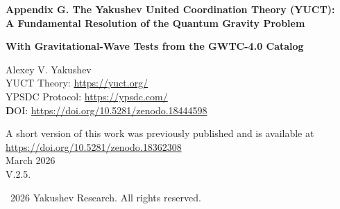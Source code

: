 \documentclass[12pt,a4paper]{article}
\theoremstyle{remark}
\newcommand{\Keff}{K_{\mathrm{eff}}}
\begin{document}
	
	\begin{titlepage}
		\begin{center}
			\vspace*{0cm}
			
			\Huge\textbf{Appendix G. The Yakushev United Coordination Theory (YUCT): \\ A Fundamental Resolution of the Quantum Gravity Problem}
			
			\vspace{0.5cm}
			\Large\textbf{With Gravitational-Wave Tests from the GWTC-4.0 Catalog}
			
			\vspace{1cm}
			\Large
			Alexey V. Yakushev\\
			
	YUCT Theory: \url{https://yuct.org/}\\
YPSDC Protocol: \url{https://ypsdc.com/}\\


\vspace{2cm}
\textbf DOI: \url{https://doi.org/10.5281/zenodo.18444598}\\

\vspace{1cm}

\vspace{0cm}
\large 
A short version of this work was previously published and is available at\\ \url{https://doi.org/10.5281/zenodo.18362308}\\
\vspace{1cm}
March 2026 \\ \large V.2.5.
			
			\vspace{5cm}
			\textcopyright~2026 Yakushev Research. All rights reserved.
			
			\newpage
			
			\begin{abstract}
				\noindent
				This paper presents a complete mathematical formulation of the Yakushev United Coordination Theory (YUCT) as a definitive solution to the quantum gravity problem. Unlike conventional approaches that attempt to quantize spacetime or gravitons, YUCT posits that both quantum mechanics and general relativity emerge from a more fundamental principle of \emph{coordination}. We develop: (1) A 19-dimensional geometric framework with coordination fields $\Psi_{MN}$, (2) The D+I•R triad as ontological basis, (3) A total Lagrangian $\mathcal{L}_{\text{YUCT}}$ that unifies all physical interactions through coordination efficiency $\Keff$, (4) Derivation of both quantum dynamics and gravitational geometry as limiting cases, (5) Specific predictions for quantum-gravitational phenomena testable at laboratory and astrophysical scales. The theory eliminates the conceptual contradictions between quantum nonlocality and relativistic causality, provides a natural explanation for dark energy and dark matter, and offers a mathematically consistent framework where the ``quantum gravity problem'' dissolves into the general theory of coordinated systems.
				

\end{abstract}
\end{center}
\end{titlepage}
\end{document}
